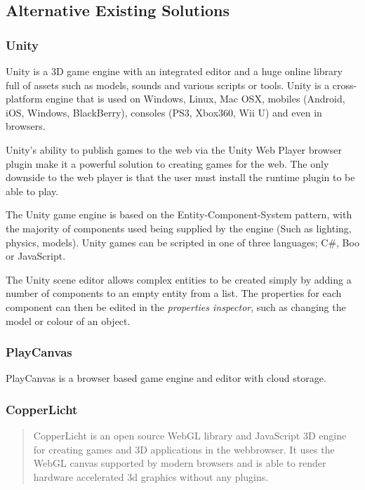 \documentclass[a4paper, 12pt]{article}
\begin{document}
\subsection{Alternative Existing Solutions}
\subsubsection{Unity}
Unity is a 3D game engine with an integrated editor and a huge online library full of assets such as models, sounds and various scripts or tools. Unity is a cross-platform engine that is used on Windows, Linux, Mac OSX, mobiles (Android, iOS, Windows, BlackBerry), consoles (PS3, Xbox360, Wii U) and even in browsers.\cite{unity}

Unity's ability to publish games to the web via the Unity Web Player browser plugin make it a powerful solution to creating games for the web. The only downside to the web player is that the user must install the runtime plugin to be able to play.\cite{unityweb}

The Unity game engine is based on the Entity-Component-System pattern, with the majority of components used being supplied by the engine (Such as lighting, physics, models).\cite{unitycomponents} Unity games can be scripted in one of three languages; C\#, Boo or JavaScript.

The Unity scene editor allows complex entities to be created simply by adding a number of components to an empty entity from a list. The properties for each component can then be edited in the \emph{properties inspector}, such as changing the model or colour of an object. \cite{unitycreatingscenes}


\subsubsection{PlayCanvas}
PlayCanvas is a browser based game engine and editor with cloud storage. 


\subsubsection{CopperLicht}
\begin{quote}
CopperLicht is an open source WebGL library and JavaScript 3D engine for creating games and 3D applications in the webbrowser. It uses the WebGL canvas supported by modern browsers and is able to render hardware accelerated 3d graphics without any plugins.\cite{copperlicht}
\end{quote}
\end{document}
